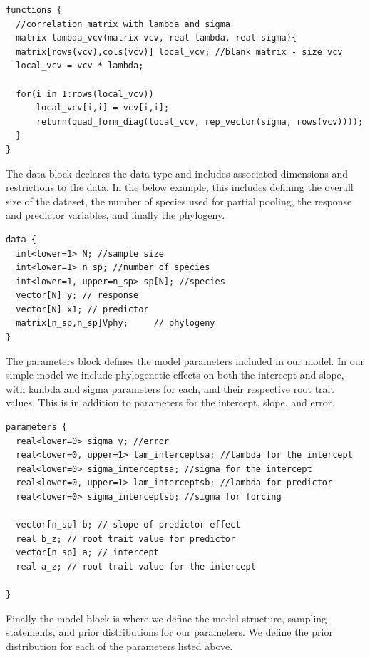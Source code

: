 \documentclass[11pt]{article}
\begin{document}
\begin{verbatim}
functions {
  //correlation matrix with lambda and sigma
  matrix lambda_vcv(matrix vcv, real lambda, real sigma){ 
  matrix[rows(vcv),cols(vcv)] local_vcv; //blank matrix - size vcv
  local_vcv = vcv * lambda; 
  
  for(i in 1:rows(local_vcv))
      local_vcv[i,i] = vcv[i,i]; 
      return(quad_form_diag(local_vcv, rep_vector(sigma, rows(vcv))));
  }
}
\end{verbatim}

The data block declares the data type and includes associated dimensions and restrictions to the data. In the below example, this includes defining the overall size of the dataset, the number of species used for partial pooling, the response and predictor variables, and finally the phylogeny. \\

\begin{verbatim}
data {
  int<lower=1> N; //sample size
  int<lower=1> n_sp; //number of species
  int<lower=1, upper=n_sp> sp[N]; //species
  vector[N] y; // response
  vector[N] x1; // predictor
  matrix[n_sp,n_sp]Vphy;     // phylogeny
}
\end{verbatim}

The parameters block defines the model parameters included in our model. In our simple model we include phylogenetic effects on both the intercept and slope, with lambda and sigma parameters for each, and their respective root trait values. This is in addition to parameters for the intercept, slope, and error.\\

\begin{verbatim}
parameters {
  real<lower=0> sigma_y; //error    
  real<lower=0, upper=1> lam_interceptsa; //lambda for the intercept       
  real<lower=0> sigma_interceptsa; //sigma for the intercept
  real<lower=0, upper=1> lam_interceptsb; //lambda for predictor    
  real<lower=0> sigma_interceptsb; //sigma for forcing
  
  vector[n_sp] b; // slope of predictor effect
  real b_z; // root trait value for predictor    
  vector[n_sp] a; // intercept
  real a_z; // root trait value for the intercept

}
\end{verbatim}

Finally the model block is where we define the model structure, sampling statements, and prior distributions for our parameters. We define the prior distribution for each of the parameters listed above.\\
\end{document}
